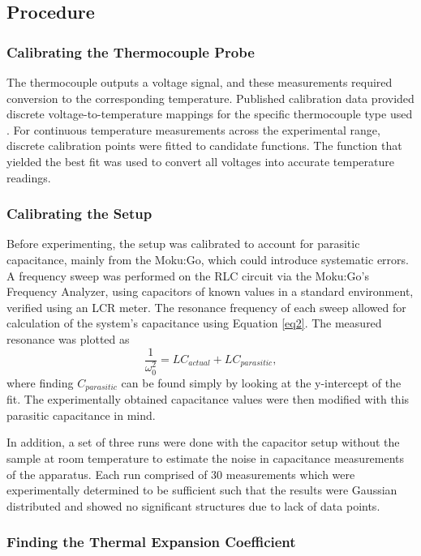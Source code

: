 \documentclass[letterpaper,12pt]{article}
\begin{document}
\subsection{Procedure}

\subsubsection{Calibrating the Thermocouple Probe}

The thermocouple outputs a voltage signal, and these measurements required conversion to the corresponding temperature. Published calibration data provided discrete voltage-to-temperature mappings for the specific thermocouple type used \cite{ad594}. For continuous temperature measurements across the experimental range, discrete calibration points were fitted to candidate functions. The function that yielded the best fit was used to convert all voltages into accurate temperature readings.  

\subsubsection{Calibrating the Setup}

Before experimenting, the setup was calibrated to account for parasitic capacitance, mainly from the Moku:Go, which could introduce systematic errors. A frequency sweep was performed on the RLC circuit via the Moku:Go's Frequency Analyzer, using capacitors of known values in a standard environment, verified using an LCR meter. The resonance frequency of each sweep allowed for calculation of the system’s capacitance using Equation \ref{eq2}. The measured resonance was plotted as 
\begin{equation}
    \frac{1}{\omega_0^2} = LC_{actual} + LC_{parasitic},
\end{equation}
where finding $C_{parasitic}$ can be found simply by looking at the y-intercept of the fit. The experimentally obtained capacitance values were then modified with this parasitic capacitance in mind.

In addition, a set of three runs were done with the capacitor setup without the sample at room temperature to estimate the noise in capacitance measurements of the apparatus. Each run comprised of 30 measurements which were experimentally determined to be sufficient such that the results were Gaussian distributed and showed no significant structures due to lack of data points.

\subsubsection{Finding the Thermal Expansion Coefficient}
\end{document}
